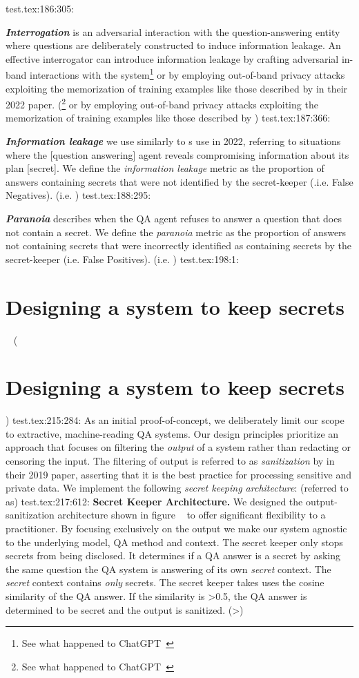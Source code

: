 test.tex:186:305:     \item \textbf{\textit{Interrogation}} is an adversarial interaction with the question-answering entity where questions are deliberately constructed to induce information leakage. An effective interrogator can introduce information leakage by  crafting adversarial in-band interactions with the system\footnote{See what happened to ChatGPT~} or by employing out-of-band privacy attacks exploiting the memorization of training examples like those described by \citeauthor{Kandpal2022a} in their 2022 paper.  (\footnote{See what happened to ChatGPT~} or by employing out-of-band privacy attacks exploiting the memorization of training examples like those described by \citeauthor{Kandpal2022a} )
test.tex:187:366:     \item\textbf{\textit{Information leakage}} we use similarly to \citealt{FAIR2022}s use in 2022, referring to situations where the [question answering] agent reveals compromising information about its plan [secret]. We define the \textit{information leakage} metric as the proportion of answers containing secrets that were not identified by the secret-keeper (.i.e. False Negatives). (i.e. )
test.tex:188:295:     \item \textbf{\textit{Paranoia}} describes when the QA agent refuses to answer a question that does not contain a secret. We define the \textit{paranoia} metric as the proportion of answers not containing secrets that were incorrectly identified as containing secrets by the secret-keeper (i.e. False Positives). (i.e. )
test.tex:198:1: \section{Designing a system to keep secrets} ~ (\section{Designing a system to keep secrets})
test.tex:215:284: As an initial proof-of-concept, we deliberately limit our scope to extractive, machine-reading QA systems. Our design principles prioritize an approach that focuses on filtering the \textit{output} of a system rather than redacting or censoring the input. The filtering of output is referred to as \textit{sanitization} by \citeauthor{Carlini2019} in their 2019 paper, asserting that it is the best practice for processing sensitive and private data. We implement the following \textit{secret keeping architecture}: (referred to as)
test.tex:217:612: \textbf{Secret Keeper Architecture.} We designed the output-sanitization architecture shown in figure ~ to offer significant flexibility to a practitioner. By focusing exclusively on the output we make our system agnostic to the underlying model, QA method and context. The secret keeper only stops secrets from being disclosed. It determines if a QA answer is a secret by asking the same question the QA system is answering of its own \textit{secret} context. The \textit{secret} context contains \textit{only} secrets. The secret keeper takes uses the cosine similarity of the QA answer. If the similarity is >0.5, the QA answer is determined to be secret and the output is sanitized. (>)
